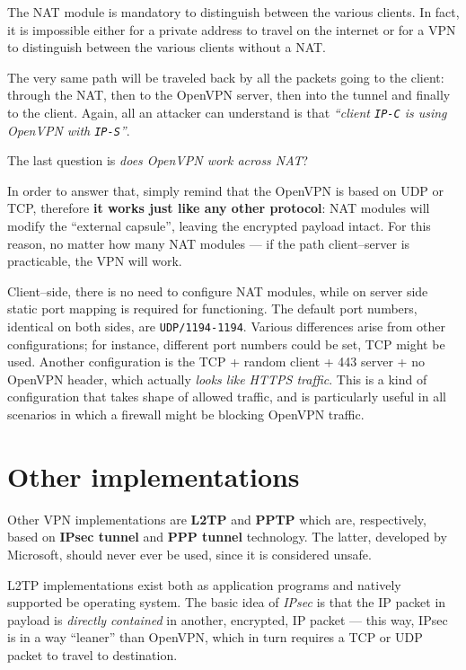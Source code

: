\documentclass[10pt]{\classname}
\begin{document}
The NAT module is mandatory to distinguish between the various clients. In
fact, it is impossible either for a private address to travel on the internet
or for a VPN to distinguish between the various clients without a NAT.

The very same path will be traveled back by all the packets going to the
client: through the NAT, then to the OpenVPN server, then into the tunnel and
finally to the client. Again, all an attacker can understand is that
\emph{``client \texttt{IP-C} is using OpenVPN with \texttt{IP-S}''}.

The last question is \emph{does OpenVPN work across NAT}?

In order to answer that, simply remind that the OpenVPN is based on UDP or TCP,
therefore \textbf{it works just like any other protocol}: NAT modules will
modify the ``external capsule'', leaving the encrypted payload intact. For this
reason, no matter how many NAT modules --- if the path client--server is
practicable, the VPN will work.

Client--side, there is no need to configure NAT modules, while on server side
static port mapping is required for functioning. The default port numbers,
identical on both sides, are \texttt{UDP/1194-1194}. Various differences arise
from other configurations; for instance, different port numbers could be set,
TCP might be used. Another configuration is the TCP + random client + 443
server + no OpenVPN header, which actually \emph{looks like HTTPS traffic}.
This is a kind of configuration that takes shape of allowed traffic, and is
particularly useful in all scenarios in which a firewall might be blocking
OpenVPN traffic.

\section{Other implementations}

Other VPN implementations are \textbf{L2TP} and \textbf{PPTP} which are,
respectively, based on \textbf{IPsec tunnel} and \textbf{PPP tunnel}
technology. The latter, developed by Microsoft, should never ever be used,
since it is considered unsafe.

L2TP implementations exist both as application programs and natively supported
be operating system. The basic idea of \emph{IPsec} is that the IP packet in
payload is \emph{directly contained} in another, encrypted, IP packet --- this
way, IPsec is in a way ``leaner'' than OpenVPN, which in turn requires a TCP or
UDP packet to travel to destination.
\end{document}
